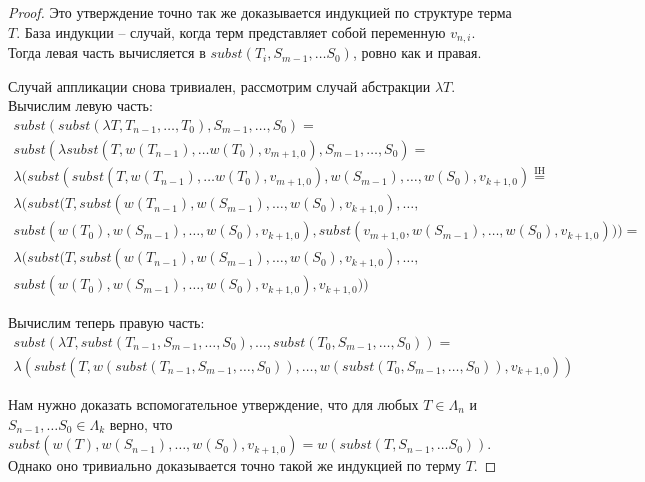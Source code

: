 \begin{proof}
  Это утверждение точно так же доказывается индукцией по структуре терма $T$. База индукции -- случай, когда терм представляет собой переменную $v_{n, i}$. Тогда левая часть вычисляется в $subst(T_{i}, S_{m-1}, \dots S_{0})$, ровно как и правая.

  Случай аппликации снова тривиален, рассмотрим случай абстракции $\lambda T$. Вычислим левую часть:
  \begin{gather*}
    subst(subst(\lambda T, T_{n-1}, \dots, T_{0}), S_{m-1}, \dots, S_{0}) = \\
    subst(\lambda subst( T, w(T_{n - 1}), \dots w(T_{0}), v_{m+1, 0} ), S_{m - 1}, \dots, S_{0}) = \\
    \lambda(subst(subst( T, w(T_{n - 1}), \dots w(T_{0}), v_{m+1, 0} ), w(S_{m-1}), \dots, w(S_{0}), v_{k+1, 0}) \overset{\mathrm{IH}}{=} \\
    \lambda(subst(T, subst(w(T_{n-1}), w(S_{m-1}), \dots, w(S_{0}), v_{k+1, 0}), \dots, \\
    subst(w(T_{0}), w(S_{m-1}), \dots, w(S_{0}), v_{k+1, 0}), subst(v_{m+1, 0}, w(S_{m-1}), \dots, w(S_{0}), v_{k+1, 0}))) = \\
    \lambda(subst(T, subst(w(T_{n-1}), w(S_{m-1}), \dots, w(S_{0}), v_{k+1, 0}), \dots, \\
    subst(w(T_{0}), w(S_{m-1}), \dots, w(S_{0}), v_{k+1, 0}), v_{k+1, 0}))
  \end{gather*}

  Вычислим теперь правую часть:
  \begin{gather*}
    subst(\lambda T, subst(T_{n-1}, S_{m - 1}, \dots, S_{0}), \dots, subst(T_{0}, S_{m - 1}, \dots, S_{0})) = \\
    \lambda(subst(T, w(subst(T_{n-1}, S_{m - 1}, \dots, S_{0})), \dots, w(subst(T_{0}, S_{m - 1}, \dots, S_{0})), v_{k+1, 0}))
  \end{gather*}

  Нам нужно доказать вспомогательное утверждение, что для любых $T \in \Lambda_{n}$ и $S_{n-1}, \dots S_{0} \in \Lambda_{k}$ верно, что $subst(w(T), w(S_{n-1}), \dots, w(S_{0}), v_{k+1, 0}) = w(subst(T, S_{n-1}, \dots S_{0}))$. Однако оно тривиально доказывается точно такой же индукцией по терму $T$.
\end{proof}
